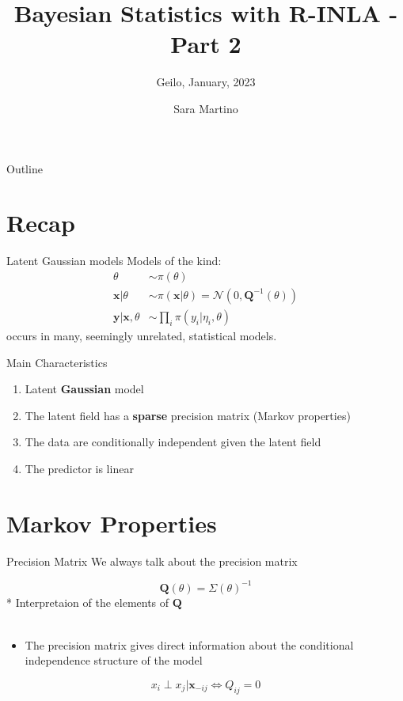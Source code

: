 \documentclass[
  ignorenonframetext,
]{beamer}
\title{Bayesian Statistics with R-INLA - Part 2}
\subtitle{Geilo, January, 2023}
\author{Sara Martino}
\date{}
\providecommand{\tightlist}{%
  \setlength{\itemsep}{0pt}\setlength{\parskip}{0pt}}
\begin{document}
\frame{\titlepage}

\begin{frame}{Outline}
\protect\hypertarget{outline}{}
\tableofcontents[hideallsubsections]
\end{frame}

\hypertarget{recap}{%
\section{Recap}\label{recap}}

\begin{frame}{Latent Gaussian models}
\protect\hypertarget{latent-gaussian-models}{}
Models of the kind: \[
\begin{aligned}
\theta & \sim \pi(\theta)\\
\mathbf{x}|\theta& \sim \pi(\mathbf{x}|\theta) = \mathcal{N}(0, \mathbf{Q}^{-1}(\theta))\\
\mathbf{y}|\mathbf{x},\theta & \sim \prod_i\pi(y_i|\eta_i,\theta)
\end{aligned}
\] occurs in many, seemingly unrelated, statistical models.
\end{frame}

\begin{frame}{Main Characteristics}
\protect\hypertarget{main-characteristics}{}
\begin{enumerate}
\tightlist
\item
  Latent \textbf{Gaussian} model
\item
  The latent field has a \textbf{sparse} precision matrix (Markov
  properties)
\item
  The data are conditionally independent given the latent field
\item
  The predictor is linear
\end{enumerate}
\end{frame}

\hypertarget{markov-properties}{%
\section{Markov Properties}\label{markov-properties}}

\begin{frame}{Precision Matrix}
\protect\hypertarget{precision-matrix}{}
We always talk about the precision matrix

\[
\mathbf{Q}(\theta) = \Sigma(\theta)^{-1}
\] * Interpretaion of the elements of \(\mathbf{Q}\)

\[
\begin{aligned}
\end{aligned}
\]

\begin{itemize}
\tightlist
\item
  The precision matrix gives direct information about the conditional
  independence structure of the model
\end{itemize}

\[
x_i\perp x_j|\mathbf{x}_{-ij} \iff Q_{ij} = 0
\]
\end{frame}
\end{document}
